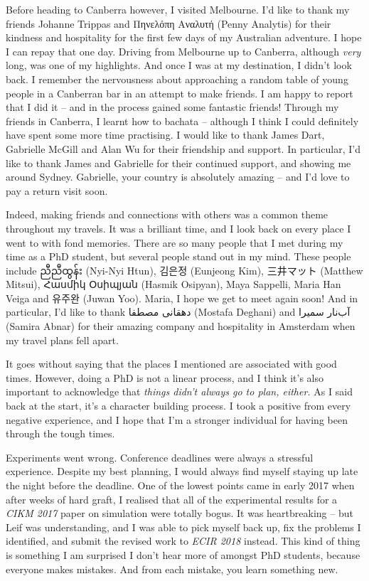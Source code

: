 \begin{preamble}
Before heading to Canberra however, I visited Melbourne. I'd like to thank my friends Johanne Trippas and Πηνελόπη Αναλυτή (Penny Analytis) for their kindness and hospitality for the first few days of my Australian adventure. I hope I can repay that one day. Driving from Melbourne up to Canberra, although \emph{very} long, was one of my highlights. And once I was at my destination, I didn't look back. I remember the nervousness about approaching a random table of young people in a Canberran bar in an attempt to make friends. I am happy to report that I did it -- and in the process gained some fantastic friends! Through my friends in Canberra, I learnt how to bachata -- although I think I could definitely have spent some more time practising. I would like to thank James Dart, Gabrielle McGill and Alan Wu for their friendship and support. In particular, I'd like to thank James and Gabrielle for their continued support, and showing me around Sydney. Gabrielle, your country is absolutely amazing -- and I'd love to pay a return visit soon.

Indeed, making friends and connections with others was a common theme throughout my travels. It was a brilliant time, and I look back on every place I went to with fond memories. There are so many people that I met during my time as a PhD student, but several people stand out in my mind. These people include {\burmesefont ညီညီထွန်း} (Nyi-Nyi Htun), {\asianfont 김은정} (Eunjeong Kim), {\asianfont 三井マット} (Matthew Mitsui), {\armenianfont Հասմիկ Օսիպյան} (Hasmik Osipyan), Maya Sappelli, Maria Han Veiga and {\asianfont 유주완} (Juwan Yoo). Maria, I hope we get to meet again soon! And in particular, I'd like to thank {\farsifont دهقانی مصطفا} (Mostafa Deghani) and {\farsifont آب‌نار سمیرا} (Samira Abnar) for their amazing company and hospitality in Amsterdam when my travel plans fell apart.

It goes without saying that the places I mentioned are associated with good times. However, doing a PhD is not a linear process, and I think it's also important to acknowledge that \emph{things didn't always go to plan, either.} As I said back at the start, it's a character building process. I took a positive from every negative experience, and I hope that I'm a stronger individual for having been through the tough times.

Experiments went wrong. Conference deadlines were always a stressful experience. Despite my best planning, I would always find myself staying up late the night before the deadline. One of the lowest points came in early 2017 when after weeks of hard graft, I realised that all of the experimental results for a \emph{CIKM 2017} paper on simulation were totally bogus. It was heartbreaking -- but Leif was understanding, and I was able to pick myself back up, fix the problems I identified, and submit the revised work to \emph{ECIR 2018} instead. This kind of thing is something I am surprised I don't hear more of amongst PhD students, because everyone makes mistakes. And from each mistake, you learn something new.


\end{preamble}
